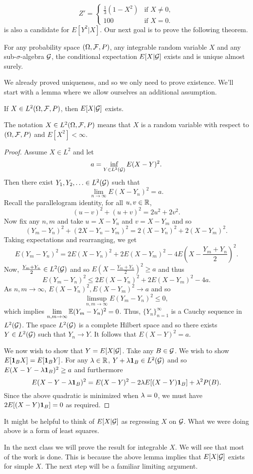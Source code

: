 \[Z' = \begin{cases}
    \frac{1}{3}(1-X^2) & \text{if } X \neq 0, \\
    100 & \text{if } X =0.
\end{cases}\]
is also a candidate for $E[Y^2|X]$. Our next goal is to prove the following theorem.
\begin{theorem}\label{existence}
    For any probability space $({{\Omega}},{\mathcal{F}},P)$, any integrable random variable $X$ and any sub-$\sigma$-algebra ${\mathcal{G}}$, the conditional expectation $E[X|{\mathcal{G}}]$ exists and is unique almost surely.
\end{theorem}
We already proved uniqueness, and so we only need to prove existence. We'll start with a lemma where we allow ourselves an additional assumption.
\begin{lemma}
    If $X \in L^2({{\Omega}},{\mathcal{F}},P)$, then $E[X|{\mathcal{G}}]$ exists.
\end{lemma}
The notation $X \in L^2({{\Omega}},{\mathcal{F}},P)$ means that $X$ is a random variable with respect to $({{\Omega}},{\mathcal{F}},P)$ and $E[X^2] < \infty$.
\begin{proof}
    Assume $X \in L^2$ and let
    \[a = \inf_{Y \in L^2({\mathcal{G}})} E(X-Y)^2. \]
    Then there exist $Y_1,Y_2,\ldots \in L^2({\mathcal{G}})$ such that 
    \[\lim_{n \to \infty} E(X-Y_n)^2 = a. \]
    Recall the parallelogram identity, for all $u,v \in {\mathbb R}$,
    \[(u-v)^2+(u+v)^2 = 2u^2+2v^2. \]
    Now fix any $n,m$ and take $u = X-Y_n$ and $v = X-Y_m$ and so 
    \[(Y_m-Y_n)^2 + (2X-Y_n-Y_m)^2 = 2(X-Y_n)^2+2(X-Y_m)^2. \]
    Taking expectations and rearranging, we get
    \[E(Y_m-Y_n)^2 = 2E(X-Y_n)^2+2E(X-Y_m)^2 - 4E\left(X- \frac{Y_m+Y_n}{2}\right)^2. \]
    Now, $\frac{Y_m+Y_n}{2} \in L^2({\mathcal{G}})$ and so $E\left(X-\frac{Y_m+Y_n}{2}\right)^2 \ge a$ and thus
    \[E(Y_m-Y_n)^2 \le 2E(X-Y_n)^2+2E(X-Y_m)^2 - 4a. \]
    As $n,m \to \infty$, $E(X-Y_n)^2, E(X-Y_m)^2 \to a$ and so 
    \[\limsup_{n,m\to \infty} E(Y_m-Y_n)^2 \le 0, \]
    which implies $\lim\limits_{n,m \to \infty} {\mathbb{E}}(Y_m-Y_n)^2 = 0$. Thus, $\{Y_n\}_{n =1}^\infty$ is a Cauchy sequence in $L^2({\mathcal{G}})$. The space $L^2({\mathcal{G}})$ is a complete Hilbert space and so there exists $Y \in L^2({\mathcal{G}})$ such that $Y_n \to Y$. It follows that $E(X-Y)^2 = a$.

    We now wish to show that $Y = E[X|{\mathcal{G}}]$. Take any $B \in {\mathcal{G}}$. We wish to show $E[{{\bf 1}}_B X] = E[{{\bf 1}}_B Y]$. For any $\lambda \in {\mathbb R}$, $Y+\lambda {{\bf 1}}_B \in L^2({\mathcal{G}})$ and so $E(X-Y-\lambda{{\bf 1}}_B)^2 \ge a$ and furthermore
    \[E(X-Y-\lambda{{\bf 1}}_B)^2 = E(X-Y)^2 -2\lambda E[(X-Y){{\bf 1}}_B] +\lambda^2P(B).\]
    Since the above quadratic is minimized when $\lambda = 0$, we must have $2E[(X-Y){{\bf 1}}_B]=0$ as required.
\end{proof} 
\begin{remark}
    It might be helpful to think of $E[X|{\mathcal{G}}]$ as regressing $X$ on ${\mathcal{G}}$. What we were doing above is a form of least squares.
\end{remark}
In the next class we will prove the result for integrable $X$. We will see that most of the work is done. This is because the above lemma implies that $E[X|{\mathcal{G}}]$ exists for simple $X$. The next step will be a familiar limiting argument.
